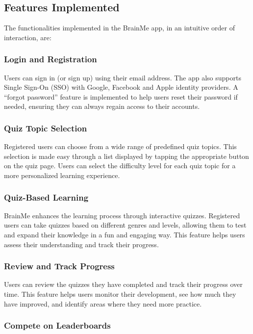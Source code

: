 \subsection{Features Implemented}

The functionalities implemented in the BrainMe app, in an intuitive order of interaction, are:

\subsubsection{Login and Registration}

Users can sign in (or sign up) using their email address. The app also supports Single Sign-On (SSO) with Google, Facebook and Apple identity providers. A “forgot password” feature is implemented to help users reset their password if needed, ensuring they can always regain access to their accounts.

\subsubsection{Quiz Topic Selection}

Registered users can choose from a wide range of predefined quiz topics. This selection is made easy through a list displayed by tapping the appropriate button on the quiz page. Users can select the difficulty level for each quiz topic for a more personalized learning experience.

\subsubsection{Quiz-Based Learning}

BrainMe enhances the learning process through interactive quizzes. Registered users can take quizzes based on different genres and levels, allowing them to test and expand their knowledge in a fun and engaging way. This feature helps users assess their understanding and track their progress.

\subsubsection{Review and Track Progress}

Users can review the quizzes they have completed and track their progress over time. This feature helps users monitor their development, see how much they have improved, and identify areas where they need more practice.

\subsubsection{Compete on Leaderboards}

